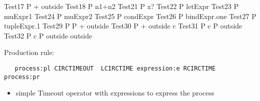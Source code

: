 \documentclass{article}
\begin{document}
\begin{circus}
   \circprocess Test17 \circdef P \circendby {} + outside \rcirctime
   \also
   \circprocess Test18 \circdef P \circendby \lcirctime n1+n2 \rcirctime 
   \also
   \circprocess Test21 \circdef P \circendby \lcirctime x? \rcirctime
   \also
   \circprocess Test22 \circdef P \circendby \lcirctime letExpr \rcirctime
   \also
   \circprocess Test23 \circdef P \circendby \lcirctime muExpr1 \rcirctime
   \also
   \circprocess Test24 \circdef P \circendby \lcirctime muExpr2 \rcirctime
   \also
   \circprocess Test25 \circdef P \circendby \lcirctime condExpr \rcirctime
   \also
   \circprocess Test26 \circdef P \circendby \lcirctime bindExpr.one \rcirctime
   \also
   \circprocess Test27 \circdef P \circendby \lcirctime tupleExpr.1 \rcirctime
   \also
   \circprocess Test29 \circdef  P \circseq P \circendby {} + outside \rcirctime
   \also
   \circprocess Test30 \circdef P \circendby {} + outside \rcirctime \circhide   
   \lchanset c \rchanset
   \also
   \circprocess Test31 \circdef  P \lpar \lchanset c \rchanset \rpar P \circendby \lcirctime 
   outside \rcirctime
   \also
   \circprocess Test32 \circdef  P \lpar \lchanset c \rchanset \rpar P \circendby  \lcirctime 
   outside \rcirctime  \circendby \lcirctime outside \rcirctime 
\end{circus}

Production rule:
\begin{verbatim}
   process:pl CIRCTIMEOUT  LCIRCTIME expression:e RCIRCTIME  process:pr
\end{verbatim}

\begin{itemize}
   \item simple Timeout operator with expressions to express the process 
\end{itemize}
\end{document}
